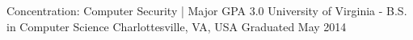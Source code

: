 \begin{cventries}
  \cventry
    {Concentration: Computer Security | Major GPA 3.0}
    {University of Virginia - B.S. in Computer Science}
    {Charlottesville, VA, USA}
    {Graduated May 2014}
    {
    }
\end{cventries}
